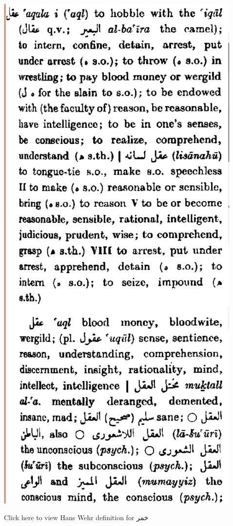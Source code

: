 \documentclass[
]{book}
\begin{document}
\includegraphics{images/aqal.png}

Click here to view Hans Wehr definition for خمر
\end{document}
